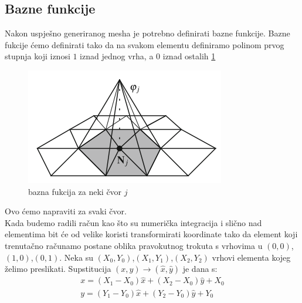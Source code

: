 \documentclass[zavrsnirad]{../fer}
\begin{document}
\subsection{Bazne funkcije}

Nakon uspješno generiranog mesha je potrebno definirati
bazne funkcije. Bazne fukcije ćemo definirati tako da
na svakom elementu definiramo polinom prvog stupnja koji
iznosi $1$ iznad jednog vrha, a $0$ iznad ostalih \ref{baznaFja}
\begin{figure}[htb]
	\centering
	\includegraphics[width=0.5\linewidth]{Figures/baznaFja.png}
	\caption{bazna fukcija za neki čvor $j$}
	\label{baznaFja}
\end{figure}
Ovo ćemo napraviti za svaki čvor. 
\bigskip
\\ 
Kada budemo radili račun kao što su numerička integracija i 
slično nad elementima bit će od velike koristi transformirati
koordinate tako da element koji trenutačno računamo postane 
oblika pravokutnog trokuta s vrhovima u $(0,0)$,$(1,0)$,$(0,1)$.
Neka su $(X_0, Y_0)$,$(X_1, Y_1)$,$(X_2, Y_2)$ vrhovi elementa
kojeg želimo preslikati. Supstitucija $(x, y) \rightarrow (\hat x, \hat y)$
je dana s:
\begin{align}
  x = (X_1 - X_0)\hat x + (X_2 - X_0)\hat y + X_0 \\ 
  y = (Y_1 - Y_0)\hat x +(Y_2 - Y_0) \hat y + Y_0
\end{align}
\end{document}
